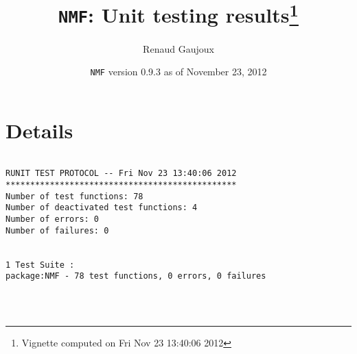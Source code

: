 \documentclass[10pt]{article}
\author{Renaud Gaujoux}
\title{\texttt{NMF}: Unit testing results\footnote{Vignette computed  on Fri Nov 23 13:40:06 2012}}
\date{\texttt{NMF} version 0.9.3 as of November 23, 2012}
\begin{document}
\maketitle

\section{Details}
\begin{verbatim}

RUNIT TEST PROTOCOL -- Fri Nov 23 13:40:06 2012 
*********************************************** 
Number of test functions: 78 
Number of deactivated test functions: 4 
Number of errors: 0 
Number of failures: 0 

 
1 Test Suite : 
package:NMF - 78 test functions, 0 errors, 0 failures




\end{verbatim}
\end{document}

